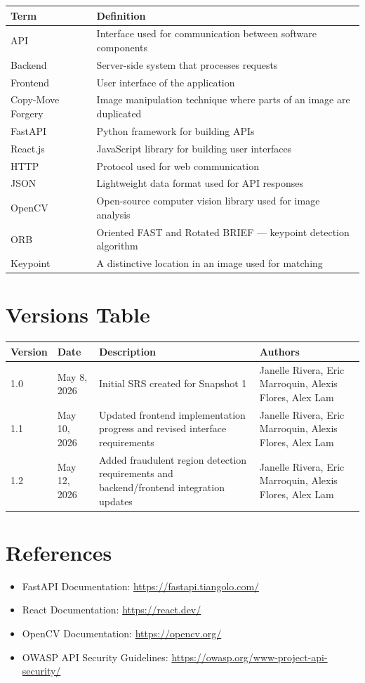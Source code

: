\documentclass[12pt]{article}
\begin{document}
\begin{longtable}{|p{4cm}|p{9cm}|}
\hline
\textbf{Term} & \textbf{Definition} \\
\hline
API & Interface used for communication between software components \\
\hline
Backend & Server-side system that processes requests \\
\hline
Frontend & User interface of the application \\
\hline
Copy-Move Forgery & Image manipulation technique where parts of an image are duplicated \\
\hline
FastAPI & Python framework for building APIs \\
\hline
React.js & JavaScript library for building user interfaces \\
\hline
HTTP & Protocol used for web communication \\
\hline
JSON & Lightweight data format used for API responses \\
\hline
OpenCV & Open-source computer vision library used for image analysis \\
\hline
ORB & Oriented FAST and Rotated BRIEF --- keypoint detection algorithm \\
\hline
Keypoint & A distinctive location in an image used for matching \\
\hline
\end{longtable}

\section{Versions Table}

\begin{longtable}{|p{1.5cm}|p{2.5cm}|p{5.5cm}|p{4cm}|}
\hline
\textbf{Version} & \textbf{Date} & \textbf{Description} & \textbf{Authors} \\
\hline
1.0 & May 8, 2026 & Initial SRS created for Snapshot 1 & Janelle Rivera, Eric Marroquin, Alexis Flores, Alex Lam \\
\hline
1.1 & May 10, 2026 & Updated frontend implementation progress and revised interface requirements & Janelle Rivera, Eric Marroquin, Alexis Flores, Alex Lam \\
\hline
1.2 & May 12, 2026 & Added fraudulent region detection requirements and backend/frontend integration updates & Janelle Rivera, Eric Marroquin, Alexis Flores, Alex Lam \\
\hline
\end{longtable}

\section{References}

\begin{itemize}
    \item FastAPI Documentation: \url{https://fastapi.tiangolo.com/}
    \item React Documentation: \url{https://react.dev/}
    \item OpenCV Documentation: \url{https://opencv.org/}
    \item OWASP API Security Guidelines: \url{https://owasp.org/www-project-api-security/}
\end{itemize}
\end{document}
